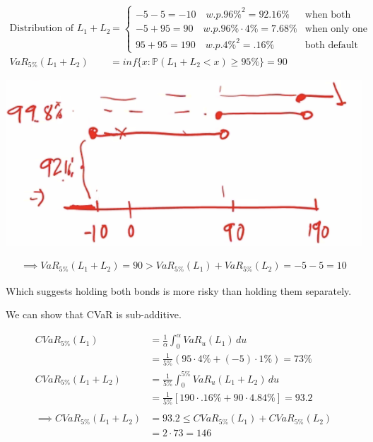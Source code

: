 \documentclass[
  oneside]{book}
\begin{document}
\[
\begin{aligned}
\text{Distribution of }L_{1} + L_{2} &= \begin{cases}
-5-5 = -10 \quad w.p. 96\%^{2}=92.16\% & \text{when both don't default}\\
-5+95 = 90 \quad w.p. 96\% \cdot 4\% = 7.68\% & \text{when only one defaults} \\
95+95=190 \quad w.p. 4\%^{2}=.16\% & \text{both default}
\end{cases}\\
VaR_{5\%} (L_{1}+L_{2}) &= inf\{x:\mathbb{P}(L_{1}+L_{2} < x) \geq 95\%\} = 90
\end{aligned}
\]

\includegraphics{Notes/Obsidian-Attachments/7-Risk-Management-7.png}

\[
\begin{aligned}
\implies VaR_{5\%}(L_{1}+L_{2}) = 90 > VaR_{5\%}(L_{1}) + VaR_{5\%}(L_{2}) = -5 -5 = 10
\end{aligned}
\]

Which suggests holding both bonds is more risky than holding them separately.

We can show that CVaR is sub-additive.

\[
\begin{aligned}
CVaR_{5\%}(L_{1}) &= \frac{1}{\alpha}\int ^{\alpha}_{0}VaR_{u}(L_{1}) \, du\\
&= \frac{1}{5\%} (95\cdot 4\% + (-5)\cdot 1\%) = 73\%\\
CVaR_{5\%}(L_{1}+L_{2}) &= \frac{1}{5\%}\int ^{5\%}_{0}VaR_{u}(L_{1}+L_{2}) \, du\\
&= \frac{1}{5\%}[190\cdot.16\%+90\cdot 4.84\%] = 93.2\\
\\
\implies CVaR_{5\%}(L_{1}+L_{2}) &= 93.2 \leq CVaR_{5\%}(L_{1})+CVaR_{5\%}(L_{2})\\
&= 2\cdot 73 = 146
\end{aligned}
\]
\end{document}
